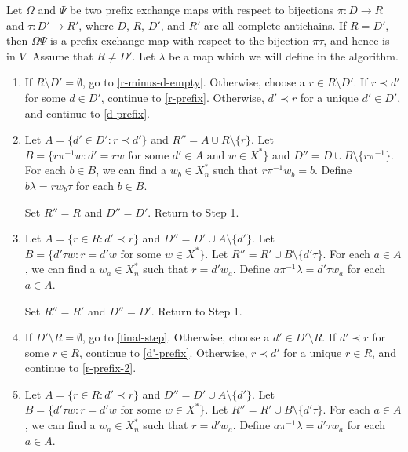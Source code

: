 \documentclass[12pt]{amsart}
\newcommand{\xns}{X_n^*}
\begin{document}
        \begin{algorithm}\label{composition-of-v-algorithm}
            Let $\Omega$ and $\Psi$ be two prefix exchange maps with respect to bijections $\pi : D \to R$ and $\tau : D' \to R'$, where $D$, $R$, $D'$, and $R'$ are all complete antichains. If $R = D'$, then $\Omega \Psi$ is a prefix exchange map with respect to the bijection $\pi \tau$, and hence is in $V$. Assume that $R \neq D'$. Let $\lambda$ be a map which we will define in the algorithm.
              
            \begin{enumerate}[label=Step \arabic*:]
                \item If $R \setminus D' = \emptyset$, go to \ref{r-minus-d-empty}. Otherwise, choose a $r \in R \setminus D'$. If $r \prec d'$ for some $d \in D'$, continue to \ref{r-prefix}. Otherwise, $d' \prec r$ for a unique $d' \in D'$, and continue to \ref{d-prefix}.
                
                \item\label{r-prefix} Let $A = \{d' \in D' : r \prec d'\}$ and $R'' = A \cup R \setminus \{r\}$. Let $B = \{r\pi^{-1}w : d' = rw \text{ for some } d' \in A \text{ and } w \in X^*\}$ and $D'' = D \cup B \setminus \{r\pi^{-1}\}$. For each $b \in B$, we can find a $w_b \in \xns$ such that $r\pi^{-1}w_b = b$. Define $b\lambda=r w_b \tau$ for each $b \in B$. 
                
                Set $R'' = R$ and $D'' = D'$. Return to Step 1.
                
                \item\label{d-prefix} Let $A = \{r \in R : d' \prec r\}$ and $D'' = D' \cup A \setminus \{d'\}$. Let $B = \{d'\tau w : r = d'w \text{ for some } w \in X^*\}$. Let $R'' = R' \cup B \setminus \{d'\tau\}$. For each $a \in A$, we can find a $w_a \in \xns$ such that $r = d'w_a$. Define $a\pi^{-1} \lambda = d'\tau w_a$ for each $a \in A$.
                
                Set $R'' = R'$ and $D'' = D'$. Return to Step 1.
                
                \item\label{r-minus-d-empty} If $D' \setminus R = \emptyset$, go to \ref{final-step}. Otherwise, choose a $d' \in D' \setminus R$. If $d' \prec r$ for some $r \in R$, continue to \ref{d'-prefix}. Otherwise, $r \prec d'$ for a unique $r \in R$, and continue to \ref{r-prefix-2}.
                
                \item\label{d'-prefix} Let $A = \{r \in R : d' \prec r\}$ and $D'' = D' \cup A \setminus \{d'\}$. Let $B = \{d' \tau w : r = d'w \text{ for some } w \in X^*\}$. Let $R'' = R' \cup B \setminus \{d'\tau\}$. For each $a \in A$, we can find a $w_a \in \xns$
                such that $r = d'w_a$. Define $a\pi^{-1}\lambda = d'\tau w_a$ for each $a \in A$.
                

\end{enumerate}
\end{algorithm}
\end{document}

